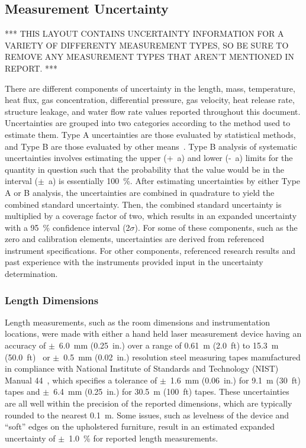 \documentclass[12pt,oneside]{book}
\begin{document}
\subsection{Measurement Uncertainty}
\label{subsec:uncertainty}

*** THIS LAYOUT CONTAINS UNCERTAINTY INFORMATION FOR A VARIETY OF DIFFERENTY MEASUREMENT TYPES, SO BE SURE TO REMOVE ANY MEASUREMENT TYPES THAT AREN'T MENTIONED IN REPORT. ***

There are different components of uncertainty in the length, mass, temperature, heat flux, gas concentration, differential pressure, gas velocity, heat release rate, structure leakage, and water flow rate values reported throughout this document. Uncertainties are grouped into two categories according to the method used to estimate them. Type A uncertainties are those evaluated by statistical methods, and Type B are those evaluated by other means~\cite{Taylor&Kuyatt:1994}. Type B analysis of systematic uncertainties involves estimating the upper (+~a) and lower (-~a) limits for the quantity in question such that the probability that the value would be in the interval ($\pm$~a) is essentially 100~\%. After estimating uncertainties by either Type A or B analysis, the uncertainties are combined in quadrature to yield the combined standard uncertainty. Then, the combined standard uncertainty is multiplied by a coverage factor of two, which results in an expanded uncertainty with a 95~\% confidence interval (2$\sigma$). For some of these components, such as the zero and calibration elements, uncertainties are derived from referenced instrument specifications. For other components, referenced research results and past experience with the instruments provided input in the uncertainty determination.

\subsubsection*{Length Dimensions}
Length measurements, such as the room dimensions and instrumentation locations, were made with either a hand held laser measurement device having an accuracy of $\pm$~6.0~mm (0.25~in.) over a range of 0.61~m (2.0~ft) to 15.3~m (50.0~ft)~\cite{StanleyTools} or $\pm$~0.5~mm (0.02~in.) resolution steel measuring tapes manufactured in compliance with National Institute of Standards and Technology (NIST) Manual 44~\cite{Butcher:2012}, which specifies a tolerance of $\pm$~1.6~mm (0.06~in.) for 9.1~m (30~ft) tapes and $\pm$~6.4~mm (0.25~in.) for 30.5~m (100~ft) tapes. These uncertainties are all well within the precision of the reported dimensions, which are typically rounded to the nearest 0.1~m. Some issues, such as levelness of the device and ``soft'' edges on the upholstered furniture, result in an estimated expanded uncertainty of $\pm$~1.0~\% for reported length measurements.
\end{document}
